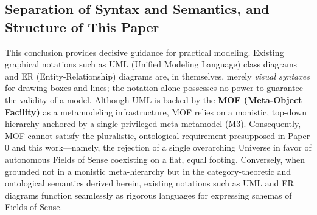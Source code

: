 \documentclass[11pt,a4paper]{article}
\theoremstyle{definition}
\theoremstyle{plain}
\theoremstyle{remark}
\begin{document}
\subsection{Separation of Syntax and Semantics, and Structure of This Paper}

This conclusion provides decisive guidance for practical modeling. Existing graphical notations such as UML (Unified Modeling Language) class diagrams and ER (Entity-Relationship) diagrams \cite{chen1976} are, in themselves, merely \emph{visual syntaxes} for drawing boxes and lines; the notation alone possesses no power to guarantee the validity of a model. Although UML is backed by the \textbf{MOF (Meta-Object Facility)} \cite{omg2019mof} as a metamodeling infrastructure, MOF relies on a monistic, top-down hierarchy anchored by a single privileged meta-metamodel (M3). Consequently, MOF cannot satisfy the pluralistic, ontological requirement presupposed in Paper 0 and this work---namely, the rejection of a single overarching Universe in favor of autonomous Fields of Sense coexisting on a flat, equal footing. Conversely, when grounded not in a monistic meta-hierarchy but in the category-theoretic and ontological semantics derived herein, existing notations such as UML and ER diagrams function seamlessly as rigorous languages for expressing schemas of Fields of Sense.
\end{document}
